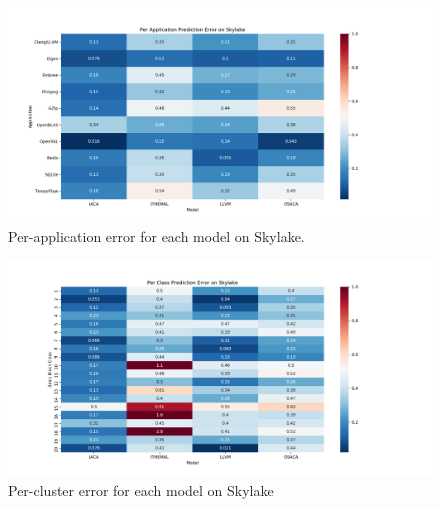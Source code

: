 \begin{figure}
\includegraphics[width=\columnwidth]{figures/skl-app-err.png}
\caption{Per-application error for each model on Skylake. }
\label{fig:hsw-app-err}
\end{figure}

\begin{figure}
\includegraphics[width=\columnwidth]{figures/skl-cluster-err.png}
\caption{Per-cluster error for each model on Skylake}
\label{fig:hsw-cluster-err}
\end{figure}    
